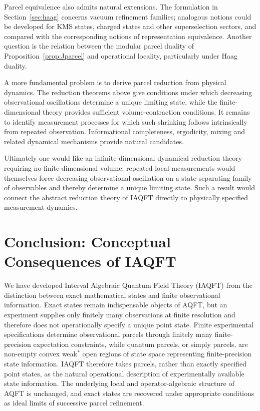 \documentclass[11pt]{article}
\begin{document}
Parcel equivalence also admits natural extensions. The formulation in
Section~\ref{sec:haag} concerns vacuum refinement families; analogous
notions could be developed for KMS states, charged states and other
superselection sectors, and compared with the corresponding notions of
representation equivalence. Another question is the relation between the
modular parcel duality of Proposition~\ref{prop:Jparcel} and operational
locality, particularly under Haag duality.

A more fundamental problem is to derive parcel reduction from physical
dynamics. The reduction theorems above give conditions under which
decreasing observational oscillations determine a unique limiting state,
while the finite-dimensional theory provides sufficient volume-contraction
conditions. It remains to identify measurement processes for which such
shrinking follows intrinsically from repeated observation. Informational
completeness, ergodicity, mixing and related dynamical mechanisms provide
natural candidates.

Ultimately one would like an infinite-dimensional dynamical reduction
theory requiring no finite-dimensional volume: repeated local
measurements would themselves force decreasing observational oscillation
on a state-separating family of observables and thereby determine a
unique limiting state. Such a result would connect the abstract
reduction theory of IAQFT directly to physically specified measurement
dynamics.
\section{Conclusion: Conceptual Consequences of IAQFT}
\label{sec:conclude}

We have developed Interval Algebraic Quantum Field Theory (IAQFT) from
the distinction between exact mathematical states and finite
observational information. Exact states remain indispensable objects of
AQFT, but an experiment supplies only finitely many observations at
finite resolution and therefore does not operationally specify a unique
point state. Finite experimental specifications determine observational
parcels through finitely many finite-precision expectation constraints,
while quantum parcels, or simply parcels, are non-empty convex weak$^*$
open regions of state space representing finite-precision state
information. IAQFT therefore takes parcels, rather than exactly specified
point states, as the natural operational description of experimentally
available state information. The underlying local and
operator-algebraic structure of AQFT is unchanged, and exact states are
recovered under appropriate conditions as ideal limits of successive
parcel refinement.
\end{document}
